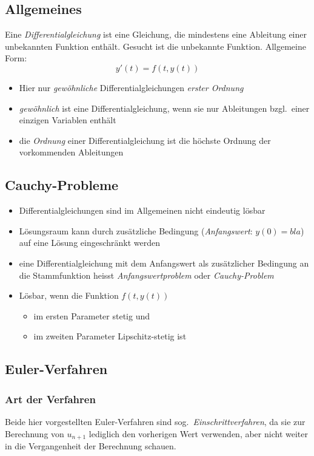 \documentclass[a4paper, 12pt]{article}
\begin{document}
\subsection{Allgemeines}
Eine \emph{Differentialgleichung} ist eine Gleichung, die mindestens eine Ableitung einer unbekannten Funktion enthält. Gesucht ist die unbekannte Funktion. Allgemeine Form:
\[
y'(t)=f(t,y(t))
\]
\begin{itemize}
  \item Hier nur \emph{gewöhnliche} Differentialgleichungen \emph{erster Ordnung}
  \item \emph{gewöhnlich} ist eine Differentialgleichung, wenn sie nur Ableitungen bzgl.\ einer einzigen Variablen enthält
  \item die \emph{Ordnung} einer Differentialgleichung ist die höchste Ordnung der vorkommenden Ableitungen
\end{itemize}


\subsection{Cauchy-Probleme}
\begin{itemize}
  \item Differentialgleichungen sind im Allgemeinen nicht eindeutig lösbar
  \item Lösungsraum kann durch zusätzliche Bedingung (\emph{Anfangswert}: \(y(0) = bla\)) auf eine Lösung eingeschränkt werden
  \item eine Differentialgleichung mit dem Anfangswert als zusätzlicher Bedingung an die Stammfunktion heisst \emph{Anfangswertproblem} oder \emph{Cauchy-Problem}
  \item Lösbar, wenn die Funktion \(f(t,y(t))\)
    \begin{itemize}
      \item im ersten Parameter stetig und
      \item im zweiten Parameter Lipschitz-stetig ist
    \end{itemize}
\end{itemize}


\subsection{Euler-Verfahren}

\subsubsection*{Art der Verfahren}
Beide hier vorgestellten Euler-Verfahren sind sog.\ \emph{Einschrittverfahren}, da sie zur Berechnung von \(u_{n+1}\) lediglich den vorherigen Wert verwenden, aber nicht weiter in die Vergangenheit der Berechnung schauen.
\end{document}
